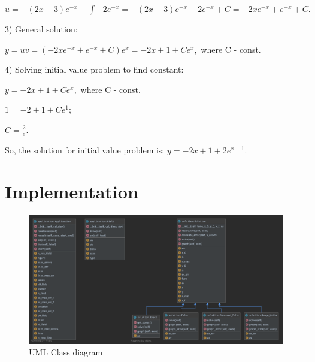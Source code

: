 \documentclass{article}
\begin{document}
$u = -(2x-3)e^{-x} - \int -2e^{-x} = -(2x-3)e^{-x} - 2e^{-x} + C = -2xe^{-x} + e^{-x} + C.$

\vspace{\baselineskip}
3) General solution:

$y = uv = (-2xe^{-x} + e^{-x} + C)e^{x} = -2x + 1 + Ce^{x},$ where C - const.

\vspace{\baselineskip}
4) Solving initial value problem to find constant:

$y = -2x + 1 + Ce^{x},$ where C - const.

$1 = -2 + 1 + Ce^{1};$

$C = \frac {2}{e}.$

So, the solution for initial value problem is: $y = -2x + 1 + 2e^{x-1}.$

\section{Implementation}

\begin{figure}[b!]
  \centering
  \includegraphics[width=\linewidth]{img.png}
  \caption{UML Class diagram}
  \label{fig: UML Class diagram}
\end{figure}
\end{document}
